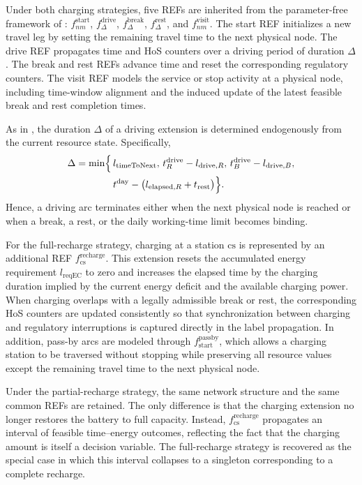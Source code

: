 \documentclass[3p,11pt,authoryear]{elsarticle}  %
\begin{document}
Under both charging strategies, five REFs are inherited from the parameter-free framework of \citet{goel2017exact}: \(f^{\text{start}}_{nm}\), \(f^{\text{drive}}_{\Delta}\), \(f^{\text{break}}_{\Delta}\), \(f^{\text{rest}}_{\Delta}\), and \(f^{\text{visit}}_{nm}\). The start REF initializes a new travel leg by setting the remaining travel time to the next physical node. The drive REF propagates time and HoS counters over a driving period of duration \(\Delta\). The break and rest REFs advance time and reset the corresponding regulatory counters. The visit REF models the service or stop activity at a physical node, including time-window alignment and the induced update of the latest feasible break and rest completion times.

As in \citet{goel2017exact}, the duration \(\Delta\) of a driving extension is determined endogenously from the current resource state. Specifically,
\[
\begin{aligned}
\Delta = \min\Bigl\{\, &
l_{\text{timeToNext}},\,
t_{R}^{\text{drive}} - l_{\text{drive},R},\,
t_{B}^{\text{drive}} - l_{\text{drive},B},\\
&
t^{\text{day}} - \bigl(l_{\text{elapsed},R} + t_{\text{rest}}\bigr)
\Bigr\}.
\end{aligned}
\]
Hence, a driving arc terminates either when the next physical node is reached or when a break, a rest, or the daily working-time limit becomes binding.

For the full-recharge strategy, charging at a station \(\mathrm{cs}\) is represented by an additional REF \(f^{\text{recharge}}_{\mathrm{cs}}\). This extension resets the accumulated energy requirement \(l_{\text{reqEC}}\) to zero and increases the elapsed time by the charging duration implied by the current energy deficit and the available charging power. When charging overlaps with a legally admissible break or rest, the corresponding HoS counters are updated consistently so that synchronization between charging and regulatory interruptions is captured directly in the label propagation. In addition, pass-by arcs are modeled through \(f^{\text{passby}}_{\text{start}}\), which allows a charging station to be traversed without stopping while preserving all resource values except the remaining travel time to the next physical node.

Under the partial-recharge strategy, the same network structure and the same common REFs are retained. The only difference is that the charging extension no longer restores the battery to full capacity. Instead, \(f^{\text{recharge}}_{\mathrm{cs}}\) propagates an interval of feasible time--energy outcomes, reflecting the fact that the charging amount is itself a decision variable. The full-recharge strategy is recovered as the special case in which this interval collapses to a singleton corresponding to a complete recharge.
\end{document}
